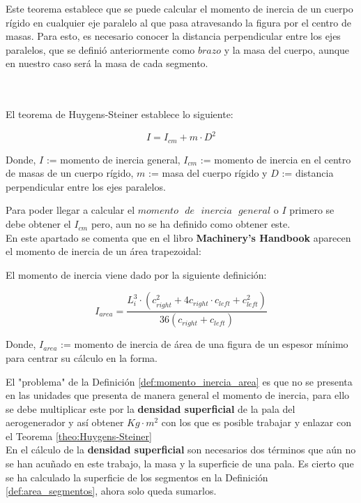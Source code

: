 Este teorema establece que se puede calcular el momento de inercia de un cuerpo rígido en cualquier eje paralelo al que pasa atravesando la figura por el centro de masas. Para esto, es necesario conocer la distancia perpendicular entre los ejes paralelos, que se definió anteriormente como $brazo$ y la masa del cuerpo, aunque en nuestro caso será la masa de cada segmento. \\\\\\


 \begin{Teorema}
El teorema de Huygens-Steiner establece lo siguiente:

$$I = I_{cm} + m \cdot D^2$$

 Donde, $I$ := momento de inercia general, $I_{cm}$ := momento de inercia en el centro de masas de un cuerpo rígido, $m$ := masa del cuerpo rígido y $D$ := distancia perpendicular entre los ejes paralelos.
 \centering 
 \label{theo:Huygens-Steiner}
 \end{Teorema}

Para poder llegar a calcular el $momento \text{ } de \text{ } inercia \text{ } general$ o $I$ primero se debe obtener el $I_{cm}$ pero, aun no se ha definido como obtener este.\\

En este apartado se comenta que en el libro \textbf{Machinery’s Handbook} aparecen el momento de inercia de un área trapezoidal:

 \begin{definicion}
El momento de inercia viene dado por la siguiente definición:

 $$ I_{area} = \dfrac{ L_{i}^3 \cdot (c_{right}^2 + 4 c_{right} \cdot c_{left} + c_{left}^2)}{ 36 (c_{right} + c_{left})} $$ 
 
 Donde, $I_{area}$ := momento de inercia de área de una figura de un espesor mínimo para centrar su cálculo en la forma.
 \centering 
 \label{def:momento_inercia_area}
 \end{definicion}
 
 El "problema" de la Definición \ref{def:momento_inercia_area} es que no se presenta en las unidades que presenta de manera general el momento de inercia, para ello se debe multiplicar este por la \textbf{densidad superficial} de la pala del aerogenerador y así obtener $Kg \cdot m^2$ con los que es posible trabajar y enlazar con el Teorema \ref{theo:Huygens-Steiner} \\

En el cálculo de la \textbf{densidad superficial} son necesarios dos términos que aún no se han acuñado en este trabajo, la masa y la superficie de una pala. Es cierto que se ha calculado la superficie de los segmentos en la Definición \ref{def:area_segmentos}, ahora solo queda sumarlos.

